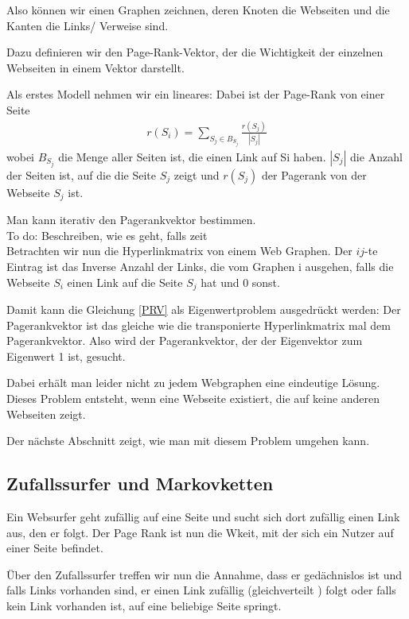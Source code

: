 \documentclass[]{article}
\begin{document}
Also können wir einen Graphen zeichnen, deren Knoten die Webseiten und die Kanten die Links/ Verweise sind. 

 Dazu definieren wir den Page-Rank-Vektor, der die Wichtigkeit der einzelnen Webseiten in einem Vektor darstellt. 
 
 Als erstes Modell nehmen wir ein lineares: Dabei ist der Page-Rank von einer Seite 
 \begin{align}
 \label{PRV}
 	r(S_i)= \sum\limits_{S_j \in B_{S_j}} \frac{r(S_j)}{|S_j|}
 \end{align} 
wobei $B_{S_j}$ die Menge aller Seiten ist, die einen Link auf Si haben. $|S_j|$ die Anzahl der Seiten ist, auf die die Seite $S_j$ zeigt und $r(S_j)$ der Pagerank von der Webseite $S_j$ ist.

Man kann iterativ den Pagerankvektor bestimmen. \\

To do: Beschreiben, wie es geht, falls zeit \\

Betrachten wir nun die Hyperlinkmatrix von einem Web Graphen. Der $ij$-te Eintrag ist das Inverse Anzahl der Links, die vom Graphen i ausgehen, falls die Webseite $S_i$ einen Link auf die Seite $S_j$ hat und 0 sonst. 

Damit kann die Gleichung \ref{PRV} als Eigenwertproblem ausgedrückt werden: Der Pagerankvektor ist das gleiche wie die transponierte Hyperlinkmatrix mal dem Pagerankvektor. Also wird der Pagerankvektor, der der Eigenvektor zum Eigenwert 1 ist, gesucht. 

Dabei erhält man leider nicht zu jedem Webgraphen eine eindeutige Lösung. Dieses Problem entsteht, wenn eine Webseite existiert, die auf keine anderen Webseiten zeigt. 

Der nächste Abschnitt zeigt, wie man mit diesem Problem umgehen kann. 

\subsection{Zufallssurfer und Markovketten}

Ein Websurfer geht zufällig auf eine Seite und sucht sich dort zufällig einen Link aus, den er folgt. Der Page Rank ist nun die Wkeit, mit der sich ein Nutzer auf einer Seite befindet. 

Über den Zufallssurfer treffen wir nun die Annahme, dass er gedächnislos ist und falls Links vorhanden sind, er einen Link zufällig (gleichverteilt ) folgt oder falls kein Link vorhanden ist, auf eine beliebige Seite springt. 
\end{document}
